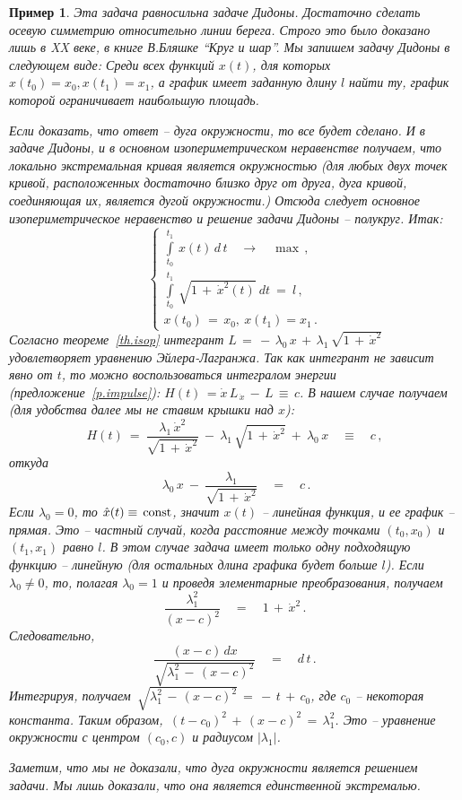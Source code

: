 \documentclass[12pt,a4paper]{article}
\newtheorem{ex}{Пример}
\begin{document}
\begin{ex}
{\em Эта задача равносильна задаче Дидоны. Достаточно сделать
осевую симметрию относительно линии берега. Строго это было
доказано лишь в XX веке, в книге В.Бляшке ``Круг и шар''. Мы
запишем задачу Дидоны в следующем виде: } Среди всех функций
$x(t)$, для которых $x(t_0)= x_0, x(t_1) = x_1$, а график имеет
заданную длину $l$ найти ту, график которой ограничивает
наибольшую площадь. {\em Если доказать, что ответ -- дуга
окружности, то все будет сделано. И в задаче Дидоны, и в основном
изопериметрическом неравенстве получаем, что локально
экстремальная кривая является окружностью (для любых двух точек
кривой, расположенных достаточно близко друг от друга, дуга
кривой, соединяющая их, является дугой окружности.) Отсюда следует
основное изопериметрическое неравенство и решение задачи Дидоны --
полукруг. Итак:
$$
\left\{
\begin{array}{l}
\int\limits_{t_0}^{t_1}\, x(t) \, d \, t\quad \to \quad \max\, ,\\
\int\limits_{t_0}^{t_1}\, \sqrt{1\, +\, \dot x^2(t)}\ d t \ = \ l\,  ,\\
x(t_0) \, = \, x_0,\ x(t_1)= x_1\, .
\end{array}
\right.
$$
Согласно теореме~\ref{th.isop} интегрант $L \, = \, - \, \lambda_0\, x
\, + \, \lambda_1\, \sqrt{1\, +\, \dot x^2}$ удовлетворяет
уравнению Эйлера-Лагранжа. Так как интегрант не зависит явно от
$t$, то можно воспользоваться интегралом энергии
(предложение~\ref{p.impulse}): $H(t)\, = \dot x\, L_{\,
\dot x}\, - \, L\, \equiv \, c$. В нашем случае получаем (для
удобства далее мы не ставим крышки над $x$):
$$
H(t)\ = \ \frac{\lambda_1\, \dot x^2}{\sqrt{1\, +\, \dot
x^2}}\ - \ \lambda_1 \, \sqrt{1\, +\, \dot x^2} \ + \ \lambda_0 \,
x\quad \equiv \quad c\, ,
$$
откуда
$$
 \ \lambda_0 \, x \ - \ \frac{\lambda_1}{\sqrt{1\, +\, \dot
x^2}}\quad = \quad  c\, .
$$
Если $\lambda_0 = 0$, то $\hat x (t)\equiv \, {\rm const}$, значит
$x(t)$ -- линейная функция, и ее график -- прямая. Это -- частный
случай, когда расстояние между точками $(t_0, x_0)$ и $(t_1, x_1)$
равно $l$. В этом случае задача имеет только одну подходящую
функцию -- линейную (для остальных длина графика будет больше
$l$). Если $\lambda_0 \ne 0$, то, полагая $\lambda_0 = 1$ и
проведя элементарные преобразования, получаем
$$
\frac{\lambda_1^2}{(x-c)^2}\quad = \quad 1\, + \, \dot x^2\, .
$$
Следовательно,
$$
\frac{(x-c)\, d x}{\sqrt{\lambda_1^2 \, - \, (x-c)^2}}\quad =
\quad d\, t\, .
$$
Интегрируя, получаем $\, \sqrt{\lambda_1^2 \, - \, (x-c)^2}\, = \,
-\, t \, + \, c_0$, где $c_0$ -- некоторая константа. Таким
образом, $\, (t-c_0)^2 \, + \, (x-c)^2\, = \, \lambda_1^2$. Это --
уравнение окружности с центром $(c_0, c)$ и радиусом
$|\lambda_1|$.

Заметим, что мы не доказали, что дуга окружности является
решением задачи. Мы лишь доказали, что она является единственной
экстремалью. }
\end{ex}
\medskip
\end{document}
